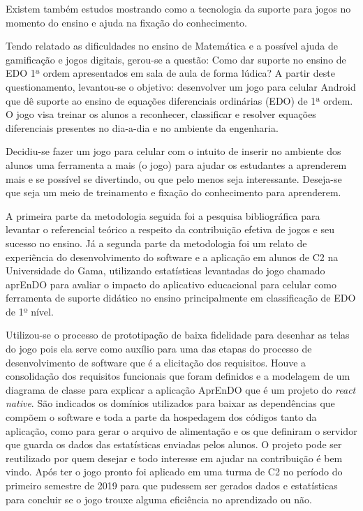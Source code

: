 Existem também estudos mostrando como a tecnologia da suporte para jogos no momento do ensino e ajuda na fixação do conhecimento. 

Tendo relatado as dificuldades no ensino de Matemática e a possível ajuda de gamificação e jogos digitais, gerou-se a questão: Como dar suporte no ensino de EDO 1ª ordem apresentados em sala de aula de forma lúdica? A partir deste questionamento, levantou-se o objetivo: desenvolver um jogo para celular Android que dê suporte ao ensino de equações diferenciais ordinárias (EDO) de 1ª ordem. O jogo visa treinar os alunos a reconhecer, classificar e resolver equações diferenciais presentes no dia-a-dia e no ambiente da engenharia.

Decidiu-se fazer um jogo para celular com o intuito de inserir no ambiente dos alunos uma ferramenta a mais (o jogo) para ajudar os estudantes a aprenderem mais e se possível se divertindo, ou que pelo menos seja interessante. Deseja-se que seja um meio de treinamento e fixação do conhecimento para aprenderem.

A primeira parte da metodologia seguida foi a pesquisa bibliográfica para levantar o referencial teórico a respeito da contribuição efetiva de jogos e seu sucesso no ensino. Já a segunda parte da metodologia foi um relato de experiência do desenvolvimento do software e a aplicação em alunos de C2 na Universidade do Gama, utilizando estatísticas levantadas do jogo chamado aprEnDO para avaliar o impacto do aplicativo educacional para celular como ferramenta de suporte didático no ensino principalmente em classificação de EDO de 1º nível.

Utilizou-se o processo de prototipação de baixa fidelidade para desenhar as telas do jogo pois ela serve como auxílio para uma das etapas do processo de desenvolvimento de software que é a elicitação dos requisitos. Houve a consolidação dos requisitos funcionais que foram definidos e a modelagem de um diagrama de classe para explicar a aplicação AprEnDO que é um projeto do \textit{react native}. São indicados os domínios utilizados para baixar as dependências que compõem o software e toda a parte da hospedagem dos códigos tanto da aplicação, como para gerar o arquivo de alimentação e os que definiram o servidor que guarda os dados das estatísticas enviadas pelos alunos. O projeto pode ser reutilizado por quem desejar e todo interesse em ajudar na contribuição é bem vindo. Após ter o jogo pronto foi aplicado em uma turma de C2 no período do primeiro semestre de 2019 para que pudessem ser gerados dados e estatísticas para concluir se o jogo trouxe alguma eficiência no aprendizado ou não.

